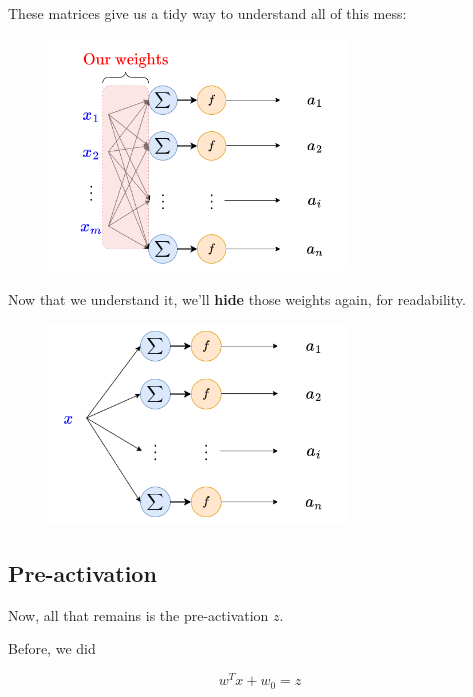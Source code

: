         These matrices give us a tidy way to understand all of this mess:
        
        \begin{figure}[H]
            \centering
            \includegraphics[width=80mm,scale=0.4]{images/nn_images/weights_highlighted.png}
        \end{figure}
        
        Now that we understand it, we'll \textbf{hide} those weights again, for readability.
        
        \begin{figure}[H]
            \centering
            \includegraphics[width=80mm,scale=0.4]{images/nn_images/remove_input.png}
        \end{figure}
        
    
    \subsection{Pre-activation}
    
        Now, all that remains is the pre-activation $z$.
        
        Before, we did 
        
        \begin{equation}
            w^Tx + w_0 = z
        \end{equation}
        
